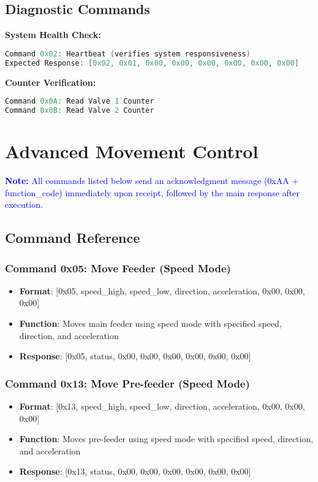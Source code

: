 \documentclass[11pt,a4paper]{article}
\newcommand{\note}[1]{\textcolor{blue}{\textbf{Note:} #1}}
\begin{document}
\subsection{Diagnostic Commands}

\textbf{System Health Check:}
\begin{lstlisting}[language=C, caption=System Health Check]
Command 0x02: Heartbeat (verifies system responsiveness)
Expected Response: [0x02, 0x01, 0x00, 0x00, 0x00, 0x00, 0x00, 0x00]
\end{lstlisting}

\textbf{Counter Verification:}
\begin{lstlisting}[language=C, caption=Counter Verification]
Command 0x0A: Read Valve 1 Counter
Command 0x0B: Read Valve 2 Counter
\end{lstlisting}

\section{Advanced Movement Control}

\note{All commands listed below send an acknowledgment message (0xAA + function\_code) immediately upon receipt, followed by the main response after execution.}

\subsection{Command Reference}

\subsubsection{Command 0x05: Move Feeder (Speed Mode)}
\begin{itemize}
    \item \textbf{Format}: [0x05, speed\_high, speed\_low, direction, acceleration, 0x00, 0x00, 0x00]
    \item \textbf{Function}: Moves main feeder using speed mode with specified speed, direction, and acceleration
    \item \textbf{Response}: [0x05, status, 0x00, 0x00, 0x00, 0x00, 0x00, 0x00]
\end{itemize}

\subsubsection{Command 0x13: Move Pre-feeder (Speed Mode)}
\begin{itemize}
    \item \textbf{Format}: [0x13, speed\_high, speed\_low, direction, acceleration, 0x00, 0x00, 0x00]
    \item \textbf{Function}: Moves pre-feeder using speed mode with specified speed, direction, and acceleration
    \item \textbf{Response}: [0x13, status, 0x00, 0x00, 0x00, 0x00, 0x00, 0x00]
\end{itemize}
\end{document}
